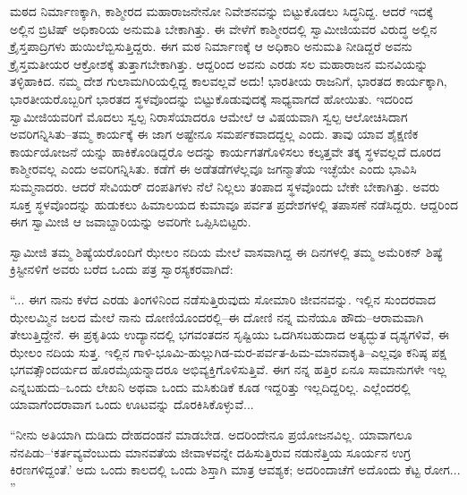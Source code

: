 ಮಠದ ನಿರ್ಮಾಣಕ್ಕಾಗಿ, ಕಾಶ್ಮೀರದ ಮಹಾರಾಜನೇನೋ ನಿವೇಶನವನ್ನು ಬಿಟ್ಟುಕೊಡಲು ಸಿದ್ಧನಿದ್ದ. ಆದರೆ ಇದಕ್ಕೆ ಅಲ್ಲಿನ ಬ್ರಿಟಿಷ್ ಅಧಿಕಾರಿಯ ಅನುಮತಿ ಬೇಕಾಗಿತ್ತು. ಈ ವೇಳೆಗೆ ಕಾಶ್ಮೀರದಲ್ಲಿ ಸ್ವಾಮೀಜಿಯವರ ವಿರುದ್ಧ ಅಲ್ಲಿನ ಕ್ರೈಸ್ತಪಾದ್ರಿಗಳು ಹುಯಿಲೆಬ್ಬಿಸುತ್ತಿದ್ದರು. ಈಗ ಮಠ ನಿರ್ಮಾಣಕ್ಕೆ ಆ ಅಧಿಕಾರಿ ಅನುಮತಿ ನೀಡಿದ್ದರೆ ಅವನು ಕ್ರೈಸ್ತಮತೀಯರ ಆಕ್ರೋಶಕ್ಕೆ ತುತ್ತಾಗಬೇಕಾಗಿತ್ತು. ಆದ್ದರಿಂದ ಅವನು ಎರಡು ಸಲ ಮಹಾರಾಜನ ಮನವಿಯನ್ನು ತಳ್ಳಿಹಾಕಿದ. ನಮ್ಮ ದೇಶ ಗುಲಾಮಗಿರಿಯಲ್ಲಿದ್ದ ಕಾಲವಲ್ಲವೆ ಅದು! ಭಾರತೀಯ ರಾಜನಿಗೆ, ಭಾರತದ ಕಾರ್ಯಕ್ಕಾಗಿ, ಭಾರತೀಯರೊಬ್ಬರಿಗೆ ಭಾರತದ ಸ್ಥಳವೊಂದನ್ನು ಬಿಟ್ಟುಕೊಡುವುದಕ್ಕೆ ಸಾಧ್ಯವಾಗದೆ ಹೋಯಿತು. ಇದರಿಂದ ಸ್ವಾಮೀಜಿಯವರಿಗೆ ಮೊದಲು ಸ್ವಲ್ಪ ನಿರಾಸೆಯಾದರೂ ಆಮೇಲೆ ಆ ವಿಷಯವಾಗಿ ಸ್ವಲ್ಪ ಆಲೋಚಿಸಿದಾಗ ಅವರಿಗನ್ನಿಸಿತು–ತಮ್ಮ ಕಾರ್ಯಕ್ಕೆ ಈ ಜಾಗ ಅಷ್ಟೇನೂ ಸಮರ್ಪಕವಾದದ್ದಲ್ಲ ಎಂದು. ತಾವು ಯಾವ ಶೈಕ್ಷಣಿಕ ಕಾರ್ಯಯೋಜನೆ ಯನ್ನು ಹಾಕಿಕೊಂಡಿದ್ದರೊ ಅದನ್ನು ಕಾರ್ಯಗತಗೊಳಿಸಲು ಕಲ್ಕತ್ತವೇ ತಕ್ಕ ಸ್ಥಳವಲ್ಲದೆ ದೂರದ ಕಾಶ್ಮೀರವಲ್ಲ ಎಂದು ಅವರಿಗನ್ನಿಸಿತು. ಕಡೆಗೆ ಈ ಅಡೆತಡೆಗಳೆಲ್ಲವೂ ಜಗನ್ಮಾತೆಯ ಇಚ್ಛೆಯೇ ಎಂದು ಭಾವಿಸಿ ಸುಮ್ಮನಾದರು. ಆದರೆ ಸೇವಿಯರ್ ದಂಪತಿಗಳು ನೆಲೆ ನಿಲ್ಲಲು ತಂಪಾದ ಸ್ಥಳವೊಂದು ಬೇಕೇ ಬೇಕಾಗಿತ್ತು. ಅವರು ಸೂಕ್ತ ಸ್ಥಳವೊಂದನ್ನು ಹುಡುಕಲು ಹಿಮಾಲಯದ ಕುಮಾವೂ ಪರ್ವತ ಪ್ರದೇಶಗಳಲ್ಲಿ ತಪಾಸಣೆ ನಡೆಸಿದ್ದರು. ಆದ್ದರಿಂದ ಈಗ ಸ್ವಾಮೀಜಿ ಆ ಜವಾಬ್ದಾರಿಯನ್ನು ಅವರಿಗೇ ಒಪ್ಪಿಸಿಬಿಟ್ಟರು.

ಸ್ವಾಮೀಜಿ ತಮ್ಮ ಶಿಷ್ಯೆಯರೊಂದಿಗೆ ಝೇಲಂ ನದಿಯ ಮೇಲೆ ವಾಸವಾಗಿದ್ದ ಈ ದಿನಗಳಲ್ಲಿ ತಮ್ಮ ಅಮೆರಿಕನ್ ಶಿಷ್ಯೆ ಕ್ರಿಸ್ಟೀನಳಿಗೆ ಅವರು ಬರೆದ ಒಂದು ಪತ್ರ ಸ್ವಾರಸ್ಯಕರವಾಗಿದೆ:

“... ಈಗ ನಾನು ಕಳೆದ ಎರಡು ತಿಂಗಳಿನಿಂದ ನಡೆಸುತ್ತಿರುವುದು ಸೋಮಾರಿ ಜೀವನವನ್ನು. ಇಲ್ಲಿನ ಸುಂದರವಾದ ಝೇಲಮ್ಮಿನ ಜಲದ ಮೇಲೆ ನಾನು ದೋಣಿಯೊಂದರಲ್ಲಿ–ಈ ದೋಣಿ ನನ್ನ ಮನೆಯೂ ಹೌದು–ಆರಾಮವಾಗಿ ತೇಲುತ್ತಿದ್ದೇನೆ. ಈ ಪ್ರಕೃತಿಯ ಉದ್ಯಾನದಲ್ಲಿ ಭಗವಂತದನ ಸೃಷ್ಟಿಯು ಒದಗಿಸಬಹುದಾದ ಅತ್ಯದ್ಭುತ ದೃಶ್ಯಗಳಿವೆ, ಈ ಝೇಲಂ ನದಿಯ ಸುತ್ತ. ಇಲ್ಲಿನ ಗಾಳಿ-ಭೂಮಿ-ಹುಲ್ಲುಗಿಡ-ಮರ-ಪರ್ವತ-ಹಿಮ-ಮಾನವಾಕೃತಿ–ಎಲ್ಲವೂ ಕನಿಷ್ಠ ಪಕ್ಷ ಭಗವತ್ಸೌಂದರ್ಯದ ಹೊರಮೈಯನ್ನಾದರೂ ಅಭಿವ್ಯಕ್ತಿಗೊಳಿಸುತ್ತಿವೆ. ಈಗ ನನ್ನ ಹತ್ತಿರ ಏನೂ ಸಾಮಾನುಗಳೇ ಇಲ್ಲ ಎನ್ನಬಹುದು–ಒಂದು ಲೇಖನಿ ಅಥವಾ ಒಂದು ಮಸಿಕುಡಿಕೆ ಕೂಡ ಇದ್ದರಿತ್ತು ಇಲ್ಲದಿದ್ದರಿಲ್ಲ. ಎಲ್ಲೆಂದರಲ್ಲಿ ಯಾವಾಗೆಂದರಾವಾಗ ಒಂದು ಊಟವನ್ನು ದೊರಕಿಸಿಕೊಳ್ಳುವೆ... 

“ನೀನು ಅತಿಯಾಗಿ ದುಡಿದು ದೇಹದಂಡನೆ ಮಾಡಬೇಡ. ಅದರಿಂದೇನೂ ಪ್ರಯೋಜನವಿಲ್ಲ. ಯಾವಾಗಲೂ ನೆನಪಿಡು–‘ಕರ್ತವ್ಯವೆಂಬುದು ಮಾನವತೆಯ ಜೀವಾಳವನ್ನೇ ದಹಿಸುತ್ತಿರುವ ನಡುನೆತ್ತಿಯ ಸೂರ್ಯನ ಉಗ್ರ ಕಿರಣಗಳಿದ್ದಂತೆ.’ ಅದು ಒಂದು ಕಾಲದಲ್ಲಿ ಒಂದು ಶಿಸ್ತಾಗಿ ಮಾತ್ರ ಆವಶ್ಯಕ; ಅದರಿಂದಾಚೆಗೆ ಅದೊಂದು ಕೆಟ್ಟ ರೋಗ... ”

